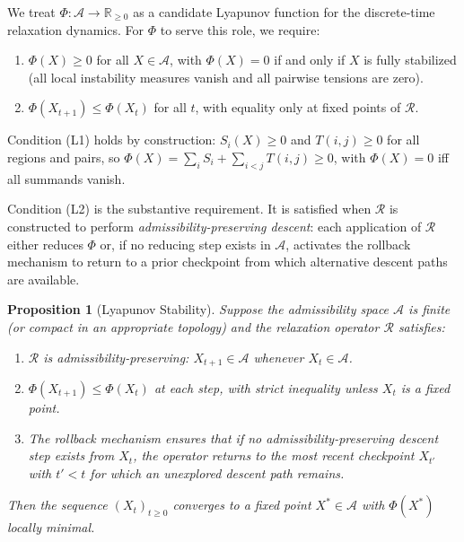 \documentclass[11pt, a4paper]{article}
\theoremstyle{srn}
\newtheorem{proposition}{Proposition}[section]
\theoremstyle{srnremark}
\newcommand{\Aspace}{\mathcal{A}}           %
\newcommand{\Rop}{\mathcal{R}}           %
\newcommand{\Phiten}{\varPhi}            %
\begin{document}
We treat $\Phiten : \Aspace \to \mathbb{R}_{\geq 0}$ as a candidate
Lyapunov function for the discrete-time relaxation dynamics.
For $\Phiten$ to serve this role, we require:

\begin{enumerate}
  \item[(L1)] $\Phiten(X) \geq 0$ for all $X \in \Aspace$, with
    $\Phiten(X) = 0$ if and only if $X$ is fully stabilized (all local
    instability measures vanish and all pairwise tensions are zero).
  \item[(L2)] $\Phiten(X_{t+1}) \leq \Phiten(X_t)$ for all $t$,
    with equality only at fixed points of $\Rop$.
\end{enumerate}

Condition (L1) holds by construction: $S_i(X) \geq 0$ and $T(i,j)
\geq 0$ for all regions and pairs, so $\Phiten(X) = \sum_i S_i +
\sum_{i<j} T(i,j) \geq 0$, with $\Phiten(X) = 0$ iff all summands
vanish.

Condition (L2) is the substantive requirement.
It is satisfied when $\Rop$ is constructed to perform
\emph{admissibility-preserving descent}: each application of $\Rop$
either reduces $\Phiten$ or, if no reducing step exists in $\Aspace$,
activates the rollback mechanism to return to a prior checkpoint from
which alternative descent paths are available.

\begin{proposition}[Lyapunov Stability]
\label{prop:lyapunov}
Suppose the admissibility space $\Aspace$ is finite (or compact in an
appropriate topology) and the relaxation operator $\Rop$ satisfies:
\begin{enumerate}
  \item[(R1)] $\Rop$ is admissibility-preserving: $X_{t+1} \in \Aspace$
    whenever $X_t \in \Aspace$.
  \item[(R2)] $\Phiten(X_{t+1}) \leq \Phiten(X_t)$ at each step, with
    strict inequality unless $X_t$ is a fixed point.
  \item[(R3)] The rollback mechanism ensures that if no
    admissibility-preserving descent step exists from $X_t$, the
    operator returns to the most recent checkpoint $X_{t'}$ with
    $t' < t$ for which an unexplored descent path remains.
\end{enumerate}
Then the sequence $(X_t)_{t \geq 0}$ converges to a fixed point
$X^* \in \Aspace$ with $\Phiten(X^*)$ locally minimal.
\end{proposition}
\end{document}
